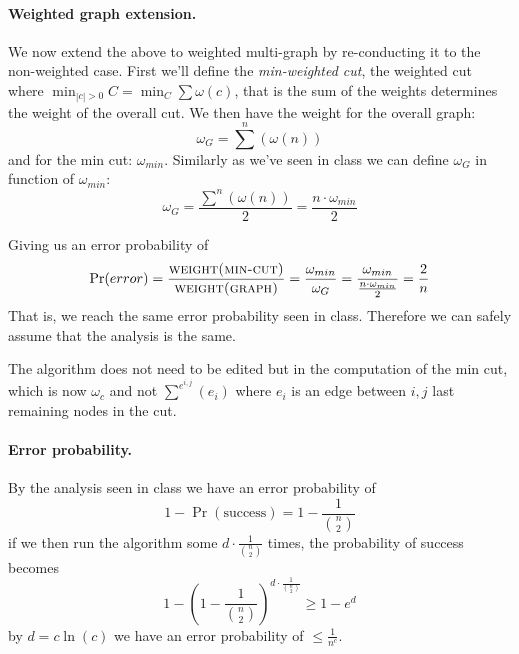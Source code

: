 \paragraph{Weighted graph extension.}
We now extend the above to weighted multi-graph by re-conducting it to the non-weighted case.
First we'll define the \emph{min-weighted cut}, the weighted cut where $\min_{|c| > 0} C = \min_{C} \sum{\omega(c)}$, that is the sum of the weights determines the weight of the overall cut.
We then have the weight for the overall graph: 
\begin{equation*}
\omega_G = \sum^{n}\left( \omega(n) \right)
\end{equation*}
and for the min cut: $\omega_{min}$.
Similarly as we've seen in class we can define $\omega_G$ in function of $\omega_{min}$:
\begin{equation*}
\omega_G = \frac{\sum^{n} \left( \omega(n) \right)}{2} = \frac{n \cdot \omega_{min}}{2}
\end{equation*}

Giving us an error probability of
\begin{equation*}
\Pr(error) = \frac{\textsc{weight(min-cut)}}{\textsc{weight(graph)}} = \frac{\omega_{min}}{\omega_G} = \frac{\omega_{min}}{\frac{n \cdot \omega_{min}}{2}} = \frac{2}{n}
\end{equation*}
That is, we reach the same error probability seen in class.
Therefore we can safely assume that the analysis is the same.

The algorithm does not need to be edited but in the computation of the min cut, which is now $\omega_c$ and not $\sum^{e^{i, j}} \left( e_i \right)$ where $e_i$ is an edge between $i, j$ last remaining nodes in the cut.

\paragraph{Error probability.}
By the analysis seen in class we have an error probability of
\begin{equation*}
1 - \Pr({\text{success}}) = 1 - \frac{1}{{{n} \choose {2}}}
\end{equation*}
if we then run the algorithm some $d \cdot \frac{1}{{{n} \choose {2}}}$ times, the probability of success becomes
\begin{equation*}
1 - \left(1 - \frac{1}{{{n} \choose {2}}} \right)^{d \cdot \frac{1}{{{n} \choose {2}}}} \geq 1 - e^{d}
\end{equation*}
by $d = c \ln(c)$ we have an error probability of $\leq \frac{1}{n^c}$.